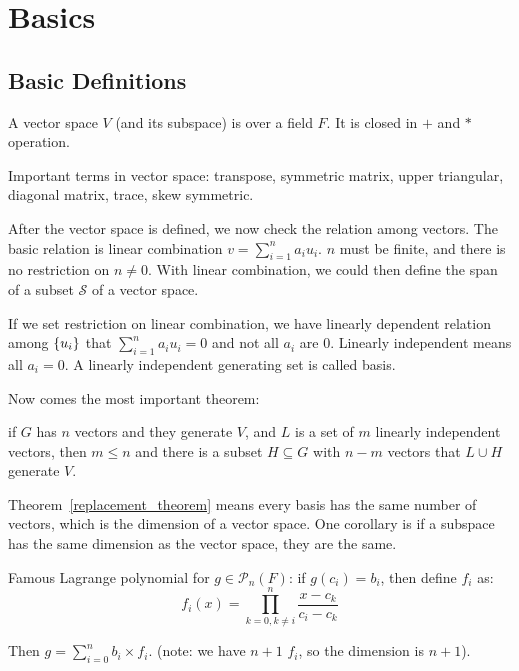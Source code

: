 \section{Basics}



\subsection{Basic Definitions}

A vector space $V$ (and its subspace) is over a field $F$. It is closed in $+$ and $*$ operation.


Important terms in vector space: transpose, symmetric matrix, upper triangular, diagonal matrix, trace, skew symmetric.

After the vector space is defined, we now check the relation among vectors. The basic relation is linear combination $v = \sum_{i=1}^{n} a_i u_i$. $n$ must be finite, and there is no restriction on $n \neq 0$. With linear combination, we could then define the span of a subset $\mathcal{S}$ of a vector space. 

If we set restriction on linear combination, we have linearly dependent relation among $\set{u_i}$ that $\sum_{i=1}^{n} a_i u_i = 0$ and not all $a_i$ are $0$. Linearly independent means all $a_i = 0$. A linearly independent generating set is called basis.

Now comes the most important theorem:
\begin{theorem}\label{replacement_theorem}
    if $G$ has $n$ vectors and they generate $V$, and $L$ is a set of $m$ linearly independent vectors, then $m \leq n$ and there is a subset $H \subseteq G$ with $n-m$ vectors that $L \cup H $ generate $V$.
    
\end{theorem}

Theorem~\ref{replacement_theorem} means every basis has the same number of vectors, which is the dimension of a vector space. One corollary is if a subspace has the same dimension as the vector space, they are the same.


Famous Lagrange polynomial for $g \in \mathcal{P}_n (F)$: if $g(c_i) = b_i$, then define $f_i$ as:
\begin{equation}
    f_i(x) = \prod_{k=0,k \neq i}^{n} \frac{x - c_k}{c_i - c_k}
\end{equation}

Then $g = \sum_{i=0}^{n} b_i \times f_i $. (note: we have $n+1$ $f_i$, so the dimension is $n+1$).

